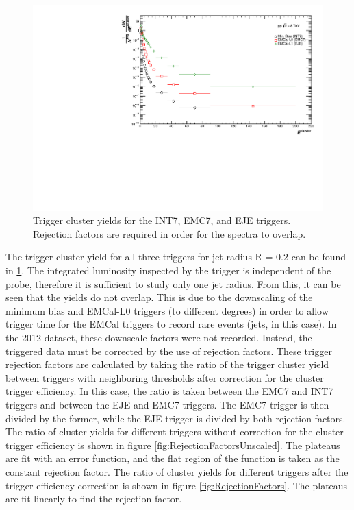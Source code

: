 \documentclass[ALICE]{ALICE_analysis_notes}
\begin{document}
\begin{figure}
    \centering
    \includegraphics[width=15cm]{figures/TriggerClusters/clusters_R02.pdf}
    \caption{Trigger cluster yields for the INT7, EMC7, and EJE triggers. Rejection factors are required in order for the spectra to overlap.}
    \label{fig:triggerClusters}
\end{figure}

The trigger cluster yield for all three triggers for jet radius R = 0.2 can be found in \ref{fig:triggerClusters}. The integrated luminosity inspected by the trigger is independent of the probe, therefore it is sufficient to study only one jet radius. From this, it can be seen that the yields do not overlap. This is due to the downscaling of the minimum bias and EMCal-L0 triggers (to different degrees) in order to allow trigger time for the EMCal triggers to record rare events (jets, in this case). In the 2012 dataset, these downscale factors were not recorded. Instead, the triggered data must be corrected by the use of rejection factors. These trigger rejection factors are calculated by taking the ratio of the trigger cluster yield between triggers with neighboring thresholds after correction for the cluster trigger efficiency. In this case, the ratio is taken between the EMC7 and INT7 triggers and between the EJE and EMC7 triggers. The EMC7 trigger is then divided by the former, while the EJE trigger is divided by both rejection factors. The ratio of cluster yields for different triggers without correction for the cluster trigger efficiency is shown in figure \ref{fig:RejectionFactorsUnscaled}. The plateaus are fit with an error function, and the flat region of the function is taken as the constant rejection factor. The ratio of cluster yields for different triggers after the trigger efficiency correction is shown in figure \ref{fig:RejectionFactors}. The plateaus are fit linearly to find the rejection factor.
\end{document}
